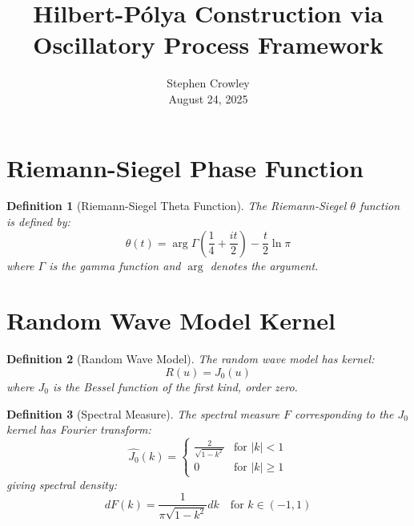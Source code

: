 \documentclass{article}
\newcommand{\tmaffiliation}[1]{\\ #1}
\newtheorem{definition}{Definition}
\begin{document}
\title{Hilbert-P{\'o}lya Construction via Oscillatory Process Framework}

\author{
  Stephen Crowley
  \tmaffiliation{August 24, 2025}
}

\maketitle

{\tableofcontents}

\section{Riemann-Siegel Phase Function}

\begin{definition}
  [Riemann-Siegel Theta Function] The Riemann-Siegel $\theta$ function is
  defined by:
  \begin{equation}
    \theta (t) = \arg \Gamma \left( \frac{1}{4} + \frac{it}{2} \right) -
    \frac{t}{2} \ln \pi
  \end{equation}
  where $\Gamma$ is the gamma function and $\arg$ denotes the argument.
\end{definition}

\section{Random Wave Model Kernel}

\begin{definition}
  [Random Wave Model] The random wave model has kernel:
  \begin{equation}
    R (u) = J_0 (u)
  \end{equation}
  where $J_0$ is the Bessel function of the first kind, order zero.
\end{definition}

\begin{definition}
  [Spectral Measure] The spectral measure $F$ corresponding to the $J_0$
  kernel has Fourier transform:
  \begin{equation}
    \widehat{J_0} (k) = \left\{\begin{array}{ll}
      \frac{2}{\sqrt{1 - k^2}} & \text{for } |k| < 1\\
      0 & \text{for } |k| \geq 1
    \end{array}\right.
  \end{equation}
  giving spectral density:
  \begin{equation}
    dF (k) = \frac{1}{\pi \sqrt{1 - k^2}} dk \quad \text{for } k \in (- 1, 1)
  \end{equation}
\end{definition}
\end{document}
